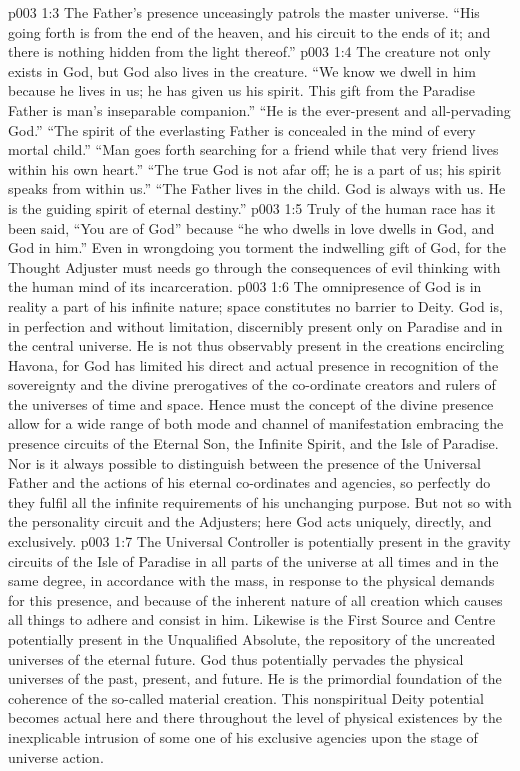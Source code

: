 \vs p003 1:3 The Father’s presence unceasingly patrols the master universe. “His going forth is from the end of the heaven, and his circuit to the ends of it; and there is nothing hidden from the light thereof.”
\vs p003 1:4 \pc The creature not only exists in God, but God also lives in the creature. “We know we dwell in him because he lives in us; he has given us his spirit. This gift from the Paradise Father is man’s inseparable companion.” “He is the ever\hyp{}present and all\hyp{}pervading God.” “The spirit of the everlasting Father is concealed in the mind of every mortal child.” “Man goes forth searching for a friend while that very friend lives within his own heart.” “The true God is not afar off; he is a part of us; his spirit speaks from within us.” “The Father lives in the child. God is always with us. He is the guiding spirit of eternal destiny.”
\vs p003 1:5 Truly of the human race has it been said, “You are of God” because “he who dwells in love dwells in God, and God in him.” Even in wrongdoing you torment the indwelling gift of God, for the Thought Adjuster must needs go through the consequences of evil thinking with the human mind of its incarceration.
\vs p003 1:6 \pc The omnipresence of God is in reality a part of his infinite nature; space constitutes no barrier to Deity. God is, in perfection and without limitation, discernibly present only on Paradise and in the central universe. He is not thus observably present in the creations encircling Havona, for God has limited his direct and actual presence in recognition of the sovereignty and the divine prerogatives of the co\hyp{}ordinate creators and rulers of the universes of time and space. Hence must the concept of the divine presence allow for a wide range of both mode and channel of manifestation embracing the presence circuits of the Eternal Son, the Infinite Spirit, and the Isle of Paradise. Nor is it always possible to distinguish between the presence of the Universal Father and the actions of his eternal co\hyp{}ordinates and agencies, so perfectly do they fulfil all the infinite requirements of his unchanging purpose. But not so with the personality circuit and the Adjusters; here God acts uniquely, directly, and exclusively.
\vs p003 1:7 \pc The Universal Controller is potentially present in the gravity circuits of the Isle of Paradise in all parts of the universe at all times and in the same degree, in accordance with the mass, in response to the physical demands for this presence, and because of the inherent nature of all creation which causes all things to adhere and consist in him. Likewise is the First Source and Centre potentially present in the Unqualified Absolute, the repository of the uncreated universes of the eternal future. God thus potentially pervades the physical universes of the past, present, and future. He is the primordial foundation of the coherence of the so\hyp{}called material creation. This nonspiritual Deity potential becomes actual here and there throughout the level of physical existences by the inexplicable intrusion of some one of his exclusive agencies upon the stage of universe action.
